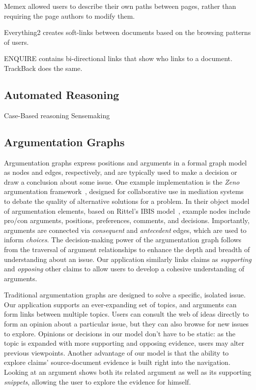\documentclass{chi2009}
\begin{document}
Memex allowed users to describe their own paths between pages, rather than requiring the page authors to modify them.

Everything2 creates soft-links between documents based on the browsing patterns of users.

ENQUIRE contains bi-directional links that show who links to a document. TrackBack does the same.

\subsection{Automated Reasoning}

Case-Based reasoning
Sensemaking

\subsection{Argumentation Graphs}
Argumentation graphs express positions and arguments in a formal graph model as nodes and edges, respectively, and are typically used to make a decision or draw a conclusion about some issue. One example implementation is the {\it Zeno} argumentation framework~\cite{zeno}, designed for collaborative use in mediation systems to debate the quality of alternative solutions for a problem. In their object model of argumentation elements, based on Rittel's IBIS model~\cite{ibis}, example nodes include pro/con arguments, positions, preferences, comments, and decisions. Importantly, arguments are connected via {\it consequent} and {\it antecedent} edges, which are used to inform {\it choices}. The decision-making power of the argumentation graph follows from the traversal of argument relationships to enhance the depth and breadth of understanding about an issue. Our application similarly links claims as {\it supporting} and {\it opposing} other claims to allow users to develop a cohesive understanding of arguments.

Traditional argumentation graphs are designed to solve a specific, isolated issue. Our application supports an ever-expanding set of topics, and arguments can form links between multiple topics. Users can consult the web of ideas directly to form an opinion about a particular issue, but they can also browse for new issues to explore. Opinions or decisions in our model don't have to be static: as the topic is expanded with more supporting and opposing evidence, users may alter previous viewpoints. Another advantage of our model is that the ability to explore claims' source-document evidence is built right into the navigation. Looking at an argument shows both its related argument as well as its supporting {\it snippets}, allowing the user to explore the evidence for himself. 
\end{document}
